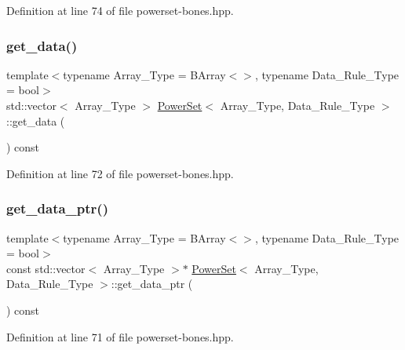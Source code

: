 Definition at line 74 of file powerset-\/bones.\+hpp.

\mbox{\label{class_power_set_a4de44631d9a7967db4dd791d42166115}} 
\subsubsection{\texorpdfstring{get\+\_\+data()}{get\_data()}}
{\footnotesize\ttfamily template$<$typename Array\+\_\+\+Type  = B\+Array$<$$>$, typename Data\+\_\+\+Rule\+\_\+\+Type  = bool$>$ \\
std\+::vector$<$ Array\+\_\+\+Type $>$ \hyperlink{class_power_set}{Power\+Set}$<$ Array\+\_\+\+Type, Data\+\_\+\+Rule\+\_\+\+Type $>$\+::get\+\_\+data (\begin{DoxyParamCaption}{ }\end{DoxyParamCaption}) const\hspace{0.3cm}{\ttfamily [inline]}}



Definition at line 72 of file powerset-\/bones.\+hpp.

\mbox{\label{class_power_set_a99cf1aa56e63a16c023bf7057b0b9288}} 
\subsubsection{\texorpdfstring{get\+\_\+data\+\_\+ptr()}{get\_data\_ptr()}}
{\footnotesize\ttfamily template$<$typename Array\+\_\+\+Type  = B\+Array$<$$>$, typename Data\+\_\+\+Rule\+\_\+\+Type  = bool$>$ \\
const std\+::vector$<$ Array\+\_\+\+Type $>$$\ast$ \hyperlink{class_power_set}{Power\+Set}$<$ Array\+\_\+\+Type, Data\+\_\+\+Rule\+\_\+\+Type $>$\+::get\+\_\+data\+\_\+ptr (\begin{DoxyParamCaption}{ }\end{DoxyParamCaption}) const\hspace{0.3cm}{\ttfamily [inline]}}



Definition at line 71 of file powerset-\/bones.\+hpp.

\mbox{\label{class_power_set_a8eefc9606c6339938a8d9adcd0d7e153}} 
